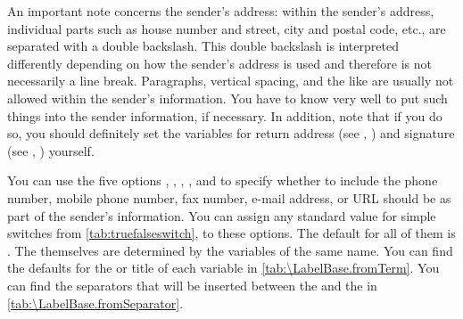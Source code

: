 An important note concerns the sender's address: within
the sender's address, individual parts such as house number and street, city
and postal code, etc., are separated with a double backslash. This double
backslash is interpreted differently depending on how the sender's address is
used and therefore is not necessarily a line break. Paragraphs, vertical
spacing, and the like are usually not allowed within the sender's information.
You have to know \KOMAScript{} very well to put such things into the sender
information, if necessary. In addition, note that if you do so, you should
definitely set the variables for return address (see
,
) and signature (see
,
) yourself.%
%
\EndIndexGroup

\begin{Declaration}
\end{Declaration}
%
You can use the five options , , ,
, and  to specify whether to include the
phone number,
mobile phone number, fax number, e-mail
address, or URL should be as part of the sender's
information. You can assign any standard value for simple switches from
\autoref{tab:truefalseswitch},  to these
options. The default for all of them is . The 
themselves are determined by the variables of the same name. You can find the
defaults for the  or title of each variable in
\autoref{tab:\LabelBase.fromTerm}. You can find the separators that will be
inserted between the  and the  in
\autoref{tab:\LabelBase.fromSeparator}.

